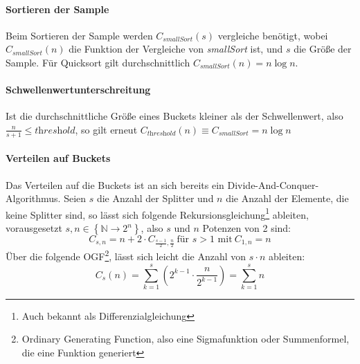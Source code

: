 		\paragraph{Sortieren der Sample}
			Beim Sortieren der Sample werden $C_\textit{smallSort}(s)$ vergleiche benötigt, wobei $C_\textit{smallSort}(n)$ die Funktion der Vergleiche von \textit{smallSort} ist, und $s$ die Größe der Sample.
			Für Quicksort gilt durchschnittlich $C_\textit{smallSort}(n)=n\log{n}$. \autocite{wikipedia-contributors-2022A}
			
		\paragraph{Schwellenwertunterschreitung}
			Ist die durchschnittliche Größe eines Buckets kleiner als der Schwellenwert, also $\frac{n}{s+1}\leq \textit{threshold}$, so gilt erneut $C_\textit{threshold}(n)\equiv C_\textit{smallSort}=n\log{n}$
		
		\paragraph{Verteilen auf Buckets}
			Das Verteilen auf die Buckets ist an sich bereits ein Divide-And-Conquer-Algorithmus.
			Seien $s$ die Anzahl der Splitter und $n$ die Anzahl der Elemente, die keine Splitter sind, so lässt sich folgende Rekursionsgleichung\footnote{Auch bekannt als Differenzialgleichung} ableiten, vorausgesetzt $s,n\in \left\{ \mathbb{N}\to 2^n \right\}$, also $s$ und $n$ Potenzen von 2 sind:
			\begin{equation}
				C_{s,n}=n+2\cdot C_{\frac{s-1}{2}, \frac{n}{2}}\ \text{für $s>1$ mit}\ C_{1,n}=n
			\end{equation}
			Über die folgende OGF\footnote{Ordinary Generating Function, also eine Sigmafunktion oder Summenformel, die eine Funktion generiert}, lässt sich leicht die Anzahl von $s\cdot n$ ableiten:
			\begin{equation}
				C_s(n)=\sum_{k=1}^{s}\left(2^{k-1}\cdot \frac{n}{2^{k-1}}\right)=\sum_{k=1}^{s}n
			\end{equation}
